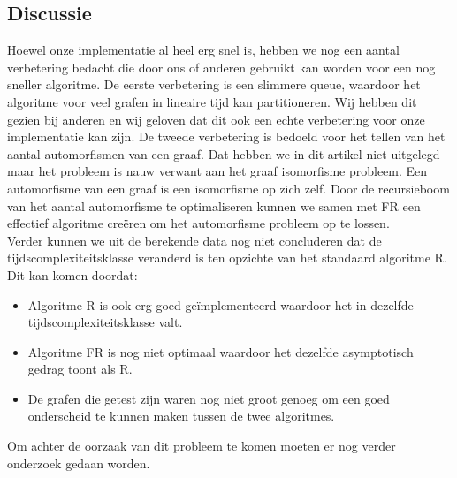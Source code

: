\documentclass[twoside]{article}
\begin{document}
\begin{multicols}{2}
\section{Discussie}
Hoewel onze implementatie al heel erg snel is, hebben we nog een aantal verbetering bedacht die door ons of anderen gebruikt kan worden voor een nog sneller algoritme. De eerste verbetering is een slimmere queue, waardoor het algoritme voor veel grafen in lineaire tijd kan partitioneren. Wij hebben dit gezien bij anderen en wij geloven dat dit ook een echte verbetering voor onze implementatie kan zijn. De tweede verbetering is bedoeld voor het tellen van het aantal automorfismen van een graaf. Dat hebben we in dit artikel niet uitgelegd maar het probleem is nauw verwant aan het graaf isomorfisme probleem. Een automorfisme van een graaf is een isomorfisme op zich zelf. Door de recursieboom van het aantal automorfisme te optimaliseren kunnen we samen met FR een effectief algoritme cre\"eren om het automorfisme probleem op te lossen.\cite{slides_aut}\\
Verder kunnen we uit de berekende data nog niet concluderen dat de tijdscomplexiteitsklasse veranderd is ten opzichte van het standaard algoritme R. Dit kan komen doordat: 
\begin{itemize}
\item Algoritme R is ook erg goed ge\"implementeerd waardoor het in dezelfde tijdscomplexiteitsklasse valt.
\item Algoritme FR is nog niet optimaal waardoor het dezelfde asymptotisch gedrag toont als R.
\item De grafen die getest zijn waren nog niet groot genoeg om een goed onderscheid te kunnen maken tussen de twee algoritmes.
\end{itemize}
Om achter de oorzaak van dit probleem te komen moeten er nog verder onderzoek gedaan worden.





\end{multicols}


\newpage
\end{document}
